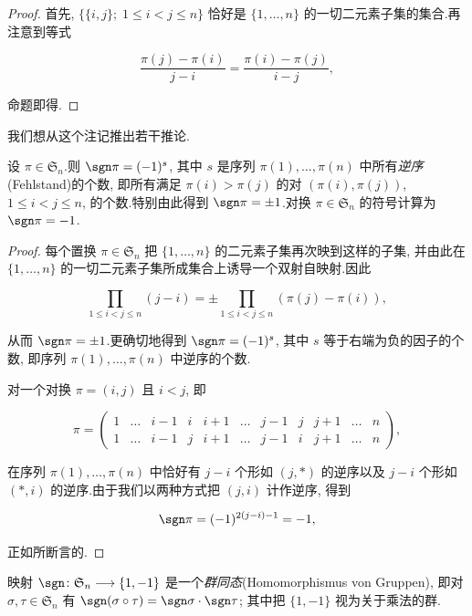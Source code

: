 \begin{proof}
首先, $\{\{i, j\};\; 1 \leq i < j \leq n\}$ 恰好是 $\{1, \ldots, n\}$ 的一切二元素子集的集合.再注意到等式

\[
\frac{\pi(j) - \pi(i)}{j - i} = \frac{\pi(i) - \pi(j)}{i - j},
\]

命题即得.
\end{proof}

我们想从这个注记推出若干推论.

\begin{theorem}\label{thm:4.1.6}
设 $\pi \in \mathfrak{S}_n$.则 $\sgn \pi = (-1)^s$, 其中 $s$ 是序列 $\pi(1), \ldots, \pi(n)$ 中所有\emph{逆序}(\textup{Fehlstand})的个数, 即所有满足 $\pi(i) > \pi(j)$ 的对 $(\pi(i), \pi(j))$, $1 \leq i < j \leq n$, 的个数.特别由此得到 $\sgn \pi = \pm 1$.对换 $\pi \in \mathfrak{S}_n$ 的符号计算为 $\sgn \pi = -1$.
\end{theorem}

\begin{proof}
每个置换 $\pi \in \mathfrak{S}_n$ 把 $\{1, \ldots, n\}$ 的二元素子集再次映到这样的子集, 并由此在 $\{1, \ldots, n\}$ 的一切二元素子集所成集合上诱导一个双射自映射.因此

\[
\prod_{1 \leq i < j \leq n} (j - i) = \pm \prod_{1 \leq i < j \leq n} (\pi(j) - \pi(i)),
\]

从而 $\sgn \pi = \pm 1$.更确切地得到 $\sgn \pi = (-1)^s$, 其中 $s$ 等于右端为负的因子的个数, 即序列 $\pi(1), \ldots, \pi(n)$ 中逆序的个数.

对一个对换 $\pi = (i, j)$ 且 $i < j$, 即

\[
\pi = \begin{pmatrix} 1 & \ldots & i-1 & i & i+1 & \ldots & j-1 & j & j+1 & \ldots & n \\ 1 & \ldots & i-1 & j & i+1 & \ldots & j-1 & i & j+1 & \ldots & n \end{pmatrix},
\]

在序列 $\pi(1), \ldots, \pi(n)$ 中恰好有 $j - i$ 个形如 $(j, *)$ 的逆序以及 $j - i$ 个形如 $(*, i)$ 的逆序.由于我们以两种方式把 $(j, i)$ 计作逆序, 得到

\[
\sgn \pi = (-1)^{2(j - i) - 1} = -1,
\]

正如所断言的.
\end{proof}

\begin{theorem}\label{thm:4.1.7}
映射 $\sgn \colon \mathfrak{S}_n \longrightarrow \{1, -1\}$ 是一个\emph{群同态}(\textup{Homomorphismus von Gruppen}), 即对 $\sigma, \tau \in \mathfrak{S}_n$ 有 $\sgn(\sigma \circ \tau) = \sgn \sigma \cdot \sgn \tau$; 其中把 $\{1, -1\}$ 视为关于乘法的群.
\end{theorem}

